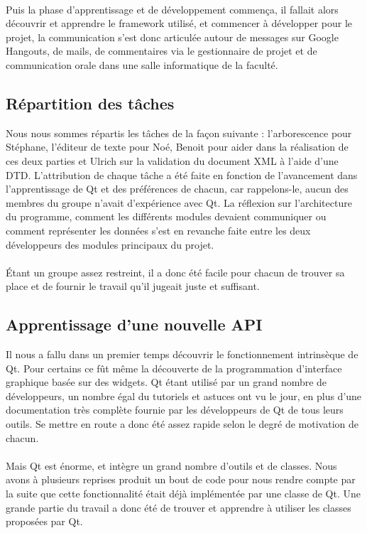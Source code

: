 \paragraph{}

Puis la phase d'apprentissage et de développement commença, il fallait alors découvrir et apprendre le framework utilisé, et commencer à développer pour le projet, la communication s'est donc articulée autour de messages sur Google Hangouts, de mails, de commentaires via le gestionnaire de projet et de communication orale dans une salle informatique de la faculté.
        
\subsection{Répartition des tâches}
Nous nous sommes répartis les tâches de la façon suivante : l'arborescence pour Stéphane, l'éditeur de texte pour Noé, Benoit pour aider dans la réalisation de ces deux parties et Ulrich sur la validation du document XML à l'aide d'une DTD. L'attribution de chaque tâche a été faite en fonction de l'avancement dans l'apprentissage de Qt et des préférences de chacun, car rappelons-le, aucun des membres du groupe n'avait d'expérience avec Qt. La réflexion sur l'architecture du programme, comment les différents modules devaient communiquer ou comment représenter les données s'est en revanche faite entre les deux développeurs des modules principaux du projet.
\paragraph{}
Étant un groupe assez restreint, il a donc été facile pour chacun de trouver sa place et de fournir le travail qu'il jugeait juste et suffisant.

\subsection{Apprentissage d'une nouvelle API}
Il nous a fallu dans un premier temps découvrir le fonctionnement intrinsèque de Qt. Pour certains ce fût même la découverte de la programmation d'interface graphique basée sur des widgets. Qt étant utilisé par un grand nombre de développeurs, un nombre égal du tutoriels et astuces ont vu le jour, en plus d'une documentation très complète fournie par les développeurs de Qt de tous leurs outils. Se mettre en route a donc été assez rapide selon le degré de motivation de chacun.
\paragraph{}
Mais Qt est énorme, et intègre un grand nombre d'outils et de classes. Nous avons à plusieurs reprises produit un bout de code pour nous rendre compte par la suite que cette fonctionnalité était déjà implémentée par une classe de Qt. Une grande partie du travail a donc été de trouver et apprendre à utiliser les classes proposées par Qt.
